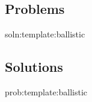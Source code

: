 \subsection{Problems}
\begin{problem}{soln:template:ballistic}{\label{prob:template:ballistic} 

}
\end{problem}

\newpage
\subsection{Solutions}
\begin{solution}{prob:template:ballistic}\label{soln:template:ballistic}

\end{solution}


